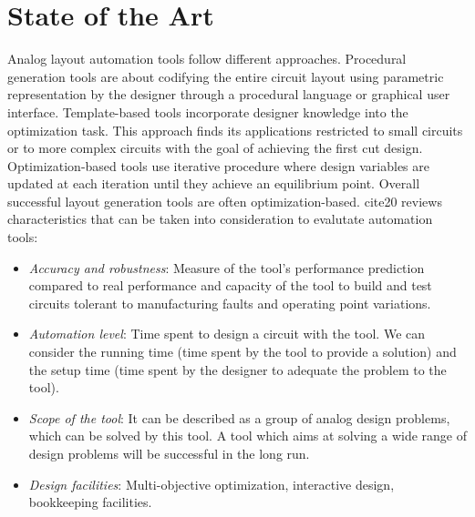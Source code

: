 \chapter{State of the Art}
Analog layout automation tools follow different approaches. Procedural generation tools are about codifying the entire circuit layout using parametric representation by the designer through a procedural language or graphical user interface. Template-based tools incorporate designer knowledge into the optimization task. This approach finds its applications restricted to small circuits or to more complex circuits with the goal of achieving the first cut design. Optimization-based tools use iterative procedure where design variables are updated at each iteration until they achieve an equilibrium point. Overall successful layout generation tools are often optimization-based.
\newline 
\newline 
\indent cite{20} reviews characteristics that can be taken into consideration to evalutate automation tools:
\begin{itemize}
\item \textit{Accuracy and robustness}: Measure of the tool's performance prediction compared to real performance 
and capacity of the tool to build and test circuits tolerant to
manufacturing faults and operating point variations.
\item \textit{Automation level}: Time spent to design a circuit with the tool. We can consider the running
time (time spent by the tool to provide a solution) and the setup time
(time spent by the designer to adequate the problem to the tool).
\item \textit{Scope of the tool}: It can be described as a group of analog design problems, which can be
solved by this tool. A tool which aims at solving a wide range of design
problems will be successful in the long run.
\item \textit{Design facilities}: Multi-objective optimization, interactive design, bookkeeping facilities.
\end{itemize}